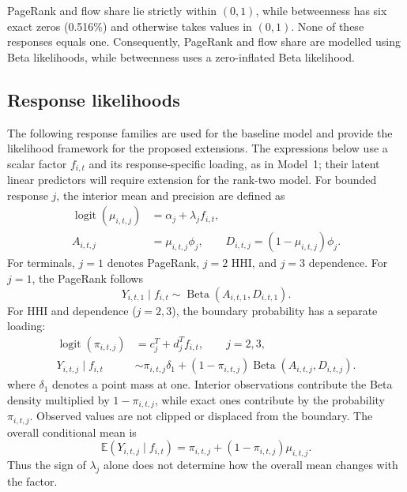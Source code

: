 \documentclass[pdftex,12pt,openright,a4paper,oneside]{book}
\begin{document}
PageRank and flow share lie strictly within
$(0,1)$, while betweenness has six exact zeros
(0.516\%) and otherwise takes values in $(0,1)$.
None of these responses equals one. Consequently,
PageRank and flow share are modelled using Beta
likelihoods, while betweenness uses a zero-inflated
Beta likelihood.


\subsection{Response likelihoods}
\label{subsec:shared_response_likelihoods}
The following response families are used for the baseline model and provide the likelihood framework for the proposed extensions. The expressions below use a scalar factor $f_{i,t}$ and its response-specific loading, as in Model~1; their latent linear predictors will require extension for the rank-two model.
For bounded response $j$, the interior mean and precision are defined as
\begin{align}
 \operatorname{logit}(\mu_{i,t,j})&=\alpha_j+\lambda_j f_{i,t},\\
 A_{i,t,j}&=\mu_{i,t,j}\phi_j,\qquad
 D_{i,t,j}=(1-\mu_{i,t,j})\phi_j.
\end{align}
For terminals, $j=1$ denotes PageRank, $j=2$ HHI, and $j=3$ dependence. For $j=1$, the PageRank follows
\begin{equation}
 Y_{i,t,1}\mid f_{i,t}\sim\operatorname{Beta}(A_{i,t,1},D_{i,t,1}).
\end{equation}
For HHI and dependence ($j=2,3$), the boundary probability has a separate loading:
\begin{equation}
\begin{aligned}
 \operatorname{logit}(\pi_{i,t,j})
 &= c^{T}_j+d^{T}_j f_{i,t},
 \qquad j=2,3,\\
 Y_{i,t,j}\mid f_{i,t}
 &\sim \pi_{i,t,j}\delta_1
 +(1-\pi_{i,t,j})
 \operatorname{Beta}(A_{i,t,j},D_{i,t,j}).
\end{aligned}
\label{eq:one_inflated_beta}
\end{equation}
where $\delta_1$ denotes a point mass at one. 
Interior observations contribute the Beta density multiplied by $1-\pi_{i,t,j}$, while exact ones contribute by the probability $\pi_{i,t,j}$. 
Observed values are not clipped or displaced from the boundary. The overall conditional mean is
\begin{equation}
 \mathbb{E}(Y_{i,t,j}\mid f_{i,t})=
 \pi_{i,t,j}+(1-\pi_{i,t,j})\mu_{i,t,j}.
 \label{eq:inflated_mean}
\end{equation}
Thus the sign of $\lambda_j$ alone does not determine how the overall mean changes with the factor.
\end{document}

